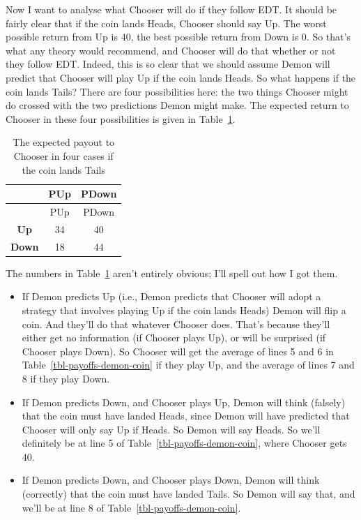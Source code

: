 \documentclass[
  12pt,
  letterpaper,
  DIV=11,
  numbers=noendperiod]{scrreprt}
\providecommand{\tightlist}{%
  \setlength{\itemsep}{0pt}\setlength{\parskip}{0pt}}\usepackage{longtable,booktabs,array}
\begin{document}
Now I want to analyse what Chooser will do if they follow EDT. It should
be fairly clear that if the coin lands Heads, Chooser should say Up. The
worst possible return from Up is 40, the best possible return from Down
is 0. So that's what any theory would recommend, and Chooser will do
that whether or not they follow EDT. Indeed, this is so clear that we
should assume Demon will predict that Chooser will play Up if the coin
lands Heads. So what happens if the coin lands Tails? There are four
possibilities here: the two things Chooser might do crossed with the two
predictions Demon might make. The expected return to Chooser in these
four possibilities is given in Table~\ref{tbl-payout-if-tails}.

\begin{longtable}[]{@{}ccc@{}}
\caption{The expected payout to Chooser in four cases if the coin lands
Tails}\label{tbl-payout-if-tails}\tabularnewline
\toprule\noalign{}
& PUp & PDown \\
\midrule\noalign{}
\endfirsthead
\toprule\noalign{}
& PUp & PDown \\
\midrule\noalign{}
\endhead
\bottomrule\noalign{}
\endlastfoot
\textbf{Up} & 34 & 40 \\
\textbf{Down} & 18 & 44 \\
\end{longtable}

The numbers in Table~\ref{tbl-payout-if-tails} aren't entirely obvious;
I'll spell out how I got them.

\begin{itemize}
\tightlist
\item
  If Demon predicts Up (i.e., Demon predicts that Chooser will adopt a
  strategy that involves playing Up if the coin lands Heads) Demon will
  flip a coin. And they'll do that whatever Chooser does. That's because
  they'll either get no information (if Chooser plays Up), or will be
  surprised (if Chooser plays Down). So Chooser will get the average of
  lines 5 and 6 in Table~\ref{tbl-payoffs-demon-coin} if they play Up,
  and the average of lines 7 and 8 if they play Down.
\item
  If Demon predicts Down, and Chooser plays Up, Demon will think
  (falsely) that the coin must have landed Heads, since Demon will have
  predicted that Chooser will only say Up if Heads. So Demon will say
  Heads. So we'll definitely be at line 5 of
  Table~\ref{tbl-payoffs-demon-coin}, where Chooser gets 40.
\item
  If Demon predicts Down, and Chooser plays Down, Demon will think
  (correctly) that the coin must have landed Tails. So Demon will say
  that, and we'll be at line 8 of Table~\ref{tbl-payoffs-demon-coin}.
\end{itemize}
\end{document}
